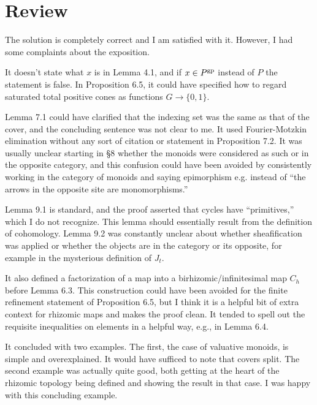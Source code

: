 \documentclass[11pt]{article}
\theoremstyle{definition}
\theoremstyle{remark}
\begin{document}
\maketitle

\section{Review}


The solution is completely correct and I am satisfied with it. However, I had some complaints about the exposition. 

It doesn't state what $x$ is in Lemma 4.1, and if $x \in P^{\rm gp}$ instead of $P$ the statement is false. In Proposition 6.5, it could have specified how to regard saturated total positive cones as functions $G \to \{0, 1\}$. 

Lemma 7.1 could have clarified that the indexing set was the same as that of the cover, and the concluding sentence was not clear to me. It used Fourier-Motzkin elimination without any sort of citation or statement in Proposition 7.2. It was usually unclear starting in \S 8 whether the monoids were considered as such or in the opposite category, and this confusion could have been avoided by consistently working in the category of monoids and saying epimorphism e.g. instead of ``the arrows in the opposite site are monomorphisms.'' 

Lemma 9.1 is standard, and the proof asserted that cycles have ``primitives,'' which I do not recognize. This lemma should essentially result from the definition of cohomology. Lemma 9.2 was constantly unclear about whether sheafification was applied or whether the objects are in the category or its opposite, for example in the mysterious definition of $J_t$. 

It also defined a factorization of a map into a birhizomic/infinitesimal map $C_h$ before Lemma 6.3. This construction could have been avoided for the finite refinement statement of Proposition 6.5, but I think it is a helpful bit of extra context for rhizomic maps and makes the proof clean. It tended to spell out the requisite inequalities on elements in a helpful way, e.g., in Lemma 6.4. 

It concluded with two examples. The first, the case of valuative monoids, is simple and overexplained. It would have sufficed to note that covers split. The second example was actually quite good, both getting at the heart of the rhizomic topology being defined and showing the result in that case. I was happy with this concluding example. 
\end{document}
